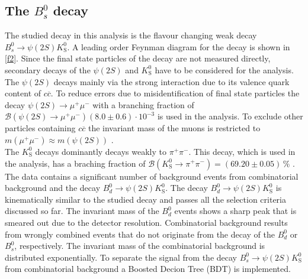 \subsection{The $B_s^0$ decay}
The studied decay in this analysis is the flavour changing weak decay $B_s^0 \rightarrow \psi(2S) K^0_\mathrm{S}$.
A leading order Feynman diagram for the decay is shown in \autoref{f2}.
Since the final state particles of the decay are not measured directly, secondary decays of the $\psi(2S)$ and $K^0_\mathrm{S}$
have to be considered for the analysis.
The $\psi(2S)$ decays mainly via the strong interaction due to its valence quark content of $c \overline{c}$.
To reduce errors due to misidentification of final state
particles the decay $\psi(2S) \rightarrow \mu^+ \mu^-$ with a branching fraction of $\mathcal{B}(\psi(2S) \rightarrow \mu^+ \mu^-)
(8.0 \pm 0.6) \cdot 10^{-3}$ \cite{pdg} is used in the analysis. To exclude other particles containing $c\overline{c}$
the invariant mass of the muons is restricted to $m(\mu^+ \mu^- ) \approx m(\psi(2S))$ .\\
The $K^0_\mathrm{S}$ decays dominantly decays weakly to $\pi^+ \pi^-$. This decay, which is used in the analysis, has a braching fraction of
$\mathcal{B}(K^0_\mathrm{S} \rightarrow \pi^+ \pi^-) = (69.20 \pm 0.05) \, \%$ \cite{pdg}. \\
The data contains a significant number of background events from combinatorial background and the decay $B^0_d \rightarrow \psi(2S) K^0_\mathrm{S}$.
The decay $B^0_d \rightarrow \psi(2S) K^0_\mathrm{S}$ is kinematically similar to the studied decay and passes all the selection criteria discussed so far.
The invariant mass of the $B^0_d$ events shows a sharp peak that is smeared out due to the detector resolution.
Combinatorial background results from wrongly combined events that do not originate from the decay of the $B^0_d$ or $B^0_s$, respectively. The invariant mass of the
combinatorial background is distributed exponentially.
To separate the signal from the decay $B_s^0 \rightarrow \psi(2S) K^0_\mathrm{S}$ from combinatorial background a Boosted Decion Tree (BDT) is implemented.

